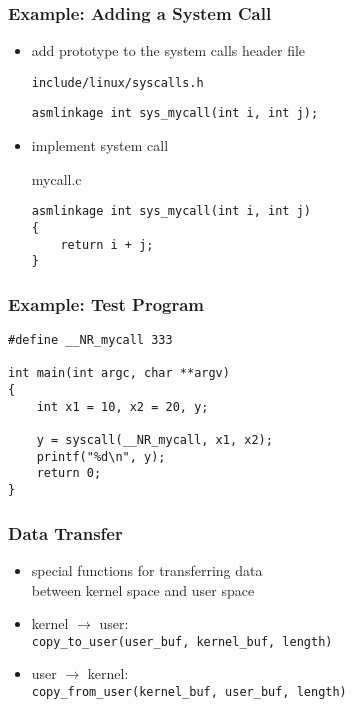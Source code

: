 \documentclass[dvipsnames]{beamer}
\begin{document}
\begin{frame}[fragile]
  \frametitle{Example: Adding a System Call}

  \begin{itemize}
    \item add prototype to the system calls header file
    \begin{exampleblock}{\texttt{include/linux/syscalls.h}}
      \begin{lstlisting}
asmlinkage int sys_mycall(int i, int j);
      \end{lstlisting}
    \end{exampleblock}

    \pause
    \medskip
    \item implement system call
    \begin{exampleblock}{mycall.c}
      \begin{lstlisting}
asmlinkage int sys_mycall(int i, int j)
{
    return i + j;
}
      \end{lstlisting}
    \end{exampleblock}
  \end{itemize}
\end{frame}

\begin{frame}[fragile]
  \frametitle{Example: Test Program}

  \begin{lstlisting}
#define __NR_mycall 333

int main(int argc, char **argv)
{
    int x1 = 10, x2 = 20, y;

    y = syscall(__NR_mycall, x1, x2);
    printf("%d\n", y);
    return 0;
}
  \end{lstlisting}
\end{frame}

\begin{frame}
  \frametitle{Data Transfer}

  \begin{itemize}
    \item special functions for transferring data\\
      between kernel space and user space

    \bigskip
    \item kernel $\rightarrow$ user:\\
      \lstinline|copy_to_user(user_buf, kernel_buf, length)|
    \smallskip
    \item user $\rightarrow$ kernel:\\
      \lstinline|copy_from_user(kernel_buf, user_buf, length)|
  \end{itemize}
\end{frame}
\end{document}
